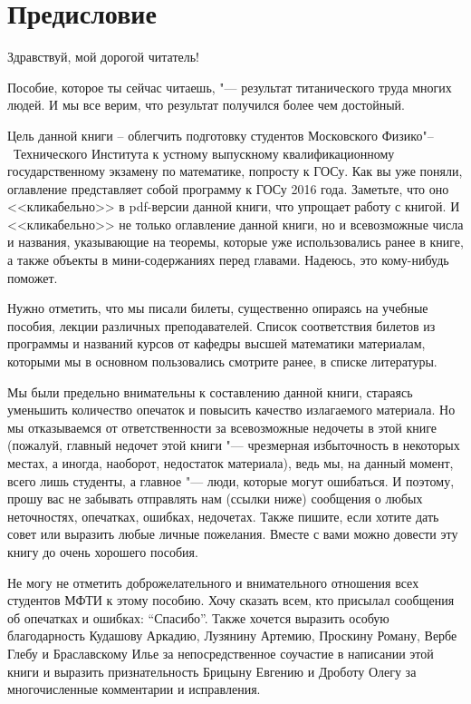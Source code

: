 \chapter{Предисловие}

\begin{center} 
	Здравствуй, мой дорогой читатель!
\end{center}

Пособие, которое ты сейчас читаешь, "--- результат титанического труда многих людей. И мы все верим, что результат получился более чем достойный. 

Цель данной книги – облегчить подготовку студентов Московского Физико"--~Технического Института к устному выпускному квалификационному государственному экзамену по математике, попросту к ГОСу. Как вы уже поняли, оглавление представляет собой программу к ГОСу 2016 года. Заметьте, что оно <<кликабельно>> в pdf-версии данной книги, что упрощает работу с книгой. И <<кликабельно>> не только оглавление данной книги, но и всевозможные числа и названия, указывающие на теоремы, которые уже использовались ранее в книге, а также объекты в мини-содержаниях перед главами. Надеюсь, это кому-нибудь поможет. 

Нужно отметить, что мы писали билеты, существенно опираясь на учебные пособия, лекции различных преподавателей. Список соответствия билетов из программы и названий курсов от кафедры высшей математики материалам, которыми мы в основном пользовались смотрите ранее, в списке литературы.

Мы были предельно внимательны к составлению данной книги, стараясь уменьшить количество опечаток и повысить качество излагаемого материала. Но мы отказываемся от ответственности за всевозможные недочеты в этой книге (пожалуй, главный недочет этой книги "--- чрезмерная избыточность в некоторых местах, а иногда, наоборот, недостаток материала), ведь мы, на данный момент, всего лишь студенты, а главное "--- люди, которые могут ошибаться. И поэтому, прошу вас не забывать отправлять нам (ссылки ниже) сообщения о любых неточностях, опечатках, ошибках, недочетах. Также пишите, если хотите дать совет или выразить любые личные пожелания. Вместе с вами можно довести эту книгу до очень хорошего пособия.

Не могу не отметить доброжелательного и внимательного отношения всех студентов МФТИ к этому пособию. Хочу сказать всем, кто присылал сообщения об опечатках и ошибках: ``Спасибо''. Также хочется выразить особую благодарность Кудашову Аркадию, Лузянину Артемию, Проскину Роману, Вербе Глебу и Браславскому Илье за непосредственное соучастие в написании этой книги и выразить признательность Брицыну Евгению и Дроботу Олегу за многочисленные комментарии и исправления.

